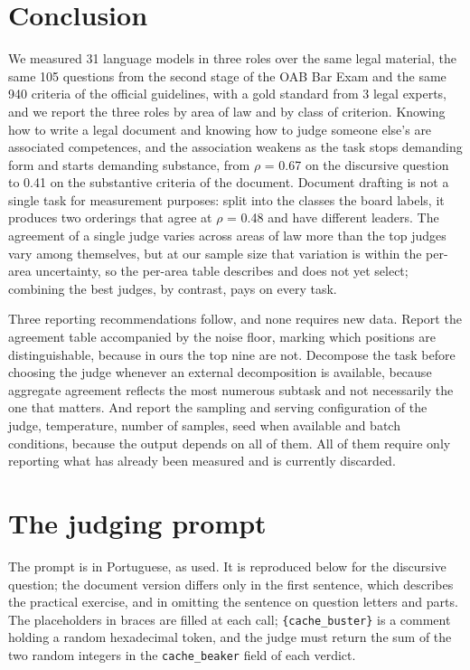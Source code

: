\documentclass{IOS-Book-Article}
\begin{document}
\section{Conclusion}

We measured 31 language models in three roles over the same legal material, the same 105 questions from the second stage of the OAB Bar Exam and the same 940 criteria of the official guidelines, with a gold standard from 3 legal experts, and we report the three roles by area of law and by class of criterion. Knowing how to write a legal document and knowing how to judge someone else's are associated competences, and the association weakens as the task stops demanding form and starts demanding substance, from $\rho$ = 0.67 on the discursive question to 0.41 on the substantive criteria of the document. Document drafting is not a single task for measurement purposes: split into the classes the board labels, it produces two orderings that agree at $\rho$ = 0.48 and have different leaders. The agreement of a single judge varies across areas of law more than the top judges vary among themselves, but at our sample size that variation is within the per-area uncertainty, so the per-area table describes and does not yet select; combining the best judges, by contrast, pays on every task.

Three reporting recommendations follow, and none requires new data. Report the agreement table accompanied by the noise floor, marking which positions are distinguishable, because in ours the top nine are not. Decompose the task before choosing the judge whenever an external decomposition is available, because aggregate agreement reflects the most numerous subtask and not necessarily the one that matters. And report the sampling and serving configuration of the judge, temperature, number of samples, seed when available and batch conditions, because the output depends on all of them. All of them require only reporting what has already been measured and is currently discarded.

\appendix

\section{The judging prompt}

The prompt is in Portuguese, as used. It is reproduced below for the discursive question; the document version differs only in the first sentence, which describes the practical exercise, and in omitting the sentence on question letters and parts. The placeholders in braces are filled at each call; \texttt{\{cache\_buster\}} is a comment holding a random hexadecimal token, and the judge must return the sum of the two random integers in the \texttt{cache\_beaker} field of each verdict.
\end{document}
